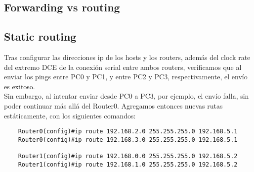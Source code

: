 \documentclass{article}
\begin{document}
\subsection{Forwarding vs routing}
\subsection{Static routing}
Tras configurar las direcciones ip de los hosts y los routers, adem\'as del clock rate del extremo DCE de la conexi\'on serial entre ambos routers, verificamos que al enviar los pings entre PC0 y PC1, y entre PC2 y PC3, respectivamente, el env\'io es exitoso. \\

Sin embargo, al intentar enviar desde PC0 a PC3, por ejemplo, el env\'io falla, sin poder continuar m\'as all\'a del Router0. Agregamos entonces nuevas rutas est\'aticamente, con los siguientes comandos:
\begin{verbatim}
    Router0(config)#ip route 192.168.2.0 255.255.255.0 192.168.5.1
    Router0(config)#ip route 192.168.3.0 255.255.255.0 192.168.5.1

    Router1(config)#ip route 192.168.0.0 255.255.255.0 192.168.5.2
    Router1(config)#ip route 192.168.1.0 255.255.255.0 192.168.5.2
    
\end{verbatim}
\end{document}
